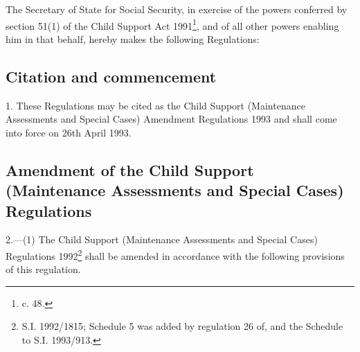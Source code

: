\documentclass[12pt,a4paper]{article}
\title{\regstitle}
\author{S.I.\ 1993 No.\ 925}
\date{Made 30th March 1993\\Laid before Parliament 5th April 1993\\Coming into force 26th April 1993}
\begin{document}
\maketitle


\medskip

\noindent
The Secretary of State for Social Security, in exercise of the powers conferred by section 51(1) of the Child Support Act 1991\footnote{ c. 48.}, and of all other powers enabling him in that behalf, hereby makes the following Regulations:

{\sloppy

\tableofcontents

}

\setcounter{secnumdepth}{-2}

\subsection[1. Citation and commencement]{Citation and commencement}

1.  These Regulations may be cited as the Child Support (Maintenance Assessments and Special Cases) Amendment Regulations 1993 and shall come into force on 26th April 1993.

\subsection[2. Amendment of the Child Support (Maintenance Assessments and Special Cases) Regulations]{Amendment of the Child Support (Maintenance Assessments and Special Cases) Regulations}

2.—(1) The Child Support (Maintenance Assessments and Special Cases) Regulations 1992\footnote{\frenchspacing S.I. 1992/1815; Schedule 5 was added by regulation 26 of, and the Schedule to S.I. 1993/913.} shall be amended in accordance with the following provisions of this regulation.
\end{document}
